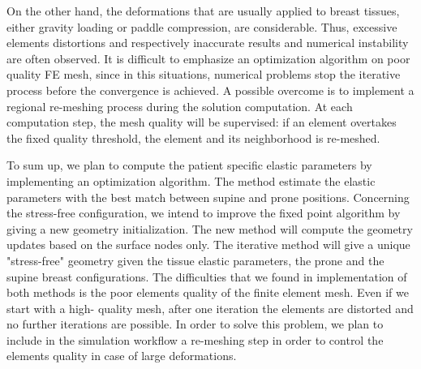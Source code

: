  On the other hand, the deformations that are usually applied to breast tissues, either gravity loading or paddle compression, are considerable. Thus, excessive elements distortions and respectively inaccurate results and numerical instability are often observed. It is difficult to emphasize an optimization algorithm on poor quality FE mesh, since in this situations, numerical problems stop the iterative process before the convergence is achieved. A possible overcome is to implement a regional re-meshing process during the solution computation. At each computation step, the mesh quality will be supervised: if an element overtakes the fixed quality threshold, the element and its neighborhood is re-meshed.  
 
To sum up, we plan to compute the patient specific elastic parameters by implementing an optimization algorithm. The method estimate the elastic parameters with the best match between supine and prone positions. Concerning the stress-free configuration, we intend to improve the fixed point algorithm by giving a new geometry initialization. The new method will compute the geometry updates based on the surface nodes only. The iterative method will give a unique "stress-free" geometry given the tissue elastic parameters, the prone and the supine breast configurations. The difficulties that we found in implementation of both methods is the poor elements quality of the finite element mesh. Even if we start with a high- quality mesh, after one iteration the elements are distorted and no further iterations are possible. In order to solve this problem, we plan to include in the simulation workflow a re-meshing step in order to control the elements quality in case of large deformations.  




	


